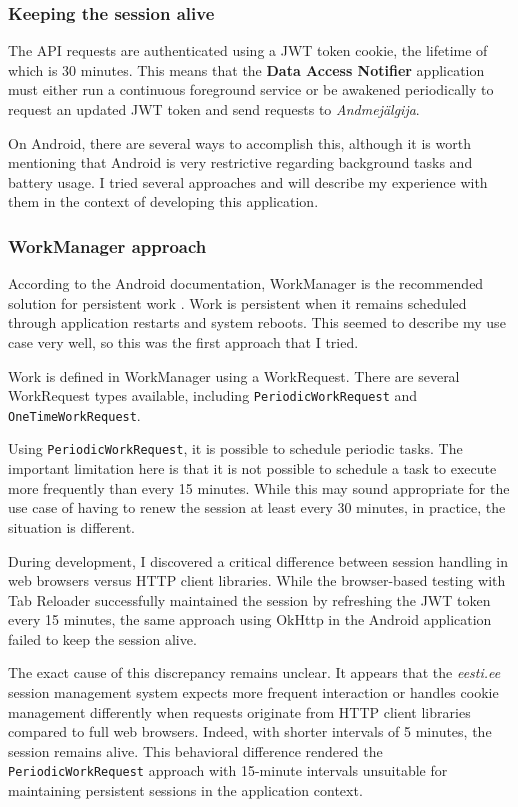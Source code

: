 \subsubsection{Keeping the session alive}
The API requests are authenticated using a JWT token cookie, the lifetime of which is 30 minutes. This means that the \textbf{Data Access Notifier} application must either run a continuous foreground service or be awakened periodically to request an updated JWT token and send requests to \textit{Andmejälgija}.

On Android, there are several ways to accomplish this, although it is worth mentioning that Android is very restrictive regarding background tasks and battery usage. I tried several approaches and will describe my experience with them in the context of developing this application.

\subsubsection{WorkManager approach}
According to the Android documentation, WorkManager is the recommended solution for persistent work \cite{android-persistent-work}. Work is persistent when it remains scheduled through application restarts and system reboots. This seemed to describe my use case very well, so this was the first approach that I tried.

Work is defined in WorkManager using a WorkRequest. There are several WorkRequest types available, including \texttt{PeriodicWorkRequest} and \texttt{OneTimeWorkRequest}.

Using \texttt{PeriodicWorkRequest}, it is possible to schedule periodic tasks. The important limitation here is that it is not possible to schedule a task to execute more frequently than every 15 minutes. While this may sound appropriate for the use case of having to renew the session at least every 30 minutes, in practice, the situation is different.

During development, I discovered a critical difference between session handling in web browsers versus HTTP client libraries. While the browser-based testing with Tab Reloader successfully maintained the session by refreshing the JWT token every 15 minutes, the same approach using OkHttp in the Android application failed to keep the session alive.

The exact cause of this discrepancy remains unclear. It appears that the \textit{eesti.ee} session management system expects more frequent interaction or handles cookie management differently when requests originate from HTTP client libraries compared to full web browsers. Indeed, with shorter intervals of 5 minutes, the session remains alive. This behavioral difference rendered the \texttt{PeriodicWorkRequest} approach with 15-minute intervals unsuitable for maintaining persistent sessions in the application context.

